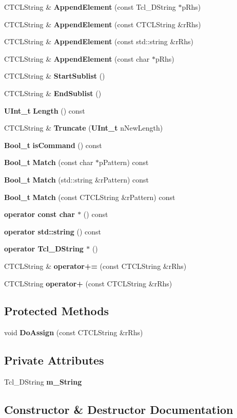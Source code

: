 \begin{CompactItemize}
CTCLString \& {\bf Append\-Element} (const Tcl\_\-DString $\ast$p\-Rhs)
\item 
CTCLString \& {\bf Append\-Element} (const CTCLString \&r\-Rhs)
\item 
CTCLString \& {\bf Append\-Element} (const std::string \&r\-Rhs)
\item 
CTCLString \& {\bf Append\-Element} (const char $\ast$p\-Rhs)
\item 
CTCLString \& {\bf Start\-Sublist} ()
\item 
CTCLString \& {\bf End\-Sublist} ()
\item 
{\bf UInt\_\-t} {\bf Length} () const
\item 
CTCLString \& {\bf Truncate} ({\bf UInt\_\-t} n\-New\-Length)
\item 
{\bf Bool\_\-t} {\bf is\-Command} () const
\item 
{\bf Bool\_\-t} {\bf Match} (const char $\ast$p\-Pattern) const
\item 
{\bf Bool\_\-t} {\bf Match} (std::string \&r\-Pattern) const
\item 
{\bf Bool\_\-t} {\bf Match} (const CTCLString \&r\-Pattern) const
\item 
{\bf operator const char $\ast$} () const
\item 
{\bf operator std::string} () const
\item 
{\bf operator Tcl\_\-DString $\ast$} ()
\item 
CTCLString \& {\bf operator+=} (const CTCLString \&r\-Rhs)
\item 
CTCLString {\bf operator+} (const CTCLString \&r\-Rhs)
\end{CompactItemize}
\subsection*{Protected Methods}
\begin{CompactItemize}
\item 
void {\bf Do\-Assign} (const CTCLString \&r\-Rhs)
\end{CompactItemize}
\subsection*{Private Attributes}
\begin{CompactItemize}
\item 
Tcl\_\-DString {\bf m\_\-String}
\end{CompactItemize}


\subsection{Constructor \& Destructor Documentation}
